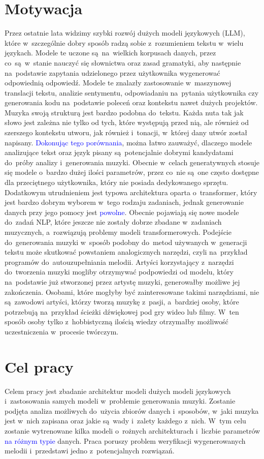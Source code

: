 \documentclass[data-science]{agh-wi} %
\begin{document}
\section{Motywacja}
Przez ostatnie lata widzimy szybki rozwój dużych modeli językowych (LLM), które w~szczególnie dobry sposób radzą sobie z~rozumieniem tekstu w~wielu językach. Modele te uczone są~na~wielkich korpusach danych, przez co~są~w~stanie nauczyć się słownictwa oraz zasad gramatyki, aby następnie na~podstawie zapytania udzielonego przez użytkownika wygenerować odpowiednią odpowiedź. Modele te znalazły zastosowanie w~maszynowej translacji tekstu, analizie sentymentu, odpowiadaniu na~pytania użytkownika czy generowania kodu na~podstawie poleceń oraz kontekstu nawet dużych projektów. Muzyka swoją strukturą jest bardzo podobna do~tekstu. Każda nuta tak jak słowo jest zależna nie tylko od tych, które występują przed nią, ale również od szerszego kontekstu utworu, jak również i~tonacji, w~której dany utwór został napisany. \textcolor{blue}{Dokonując tego porównania}, można łatwo zauważyć, dlaczego modele analizujące tekst oraz język pisany są~potencjalnie dobrymi kandydatami do~próby analizy i~generowania muzyki. Obecnie w~celach generatywnych stosuje się modele o~bardzo dużej ilości parametrów, przez co~nie są~one często dostępne dla przeciętnego użytkownika, który nie posiada dedykowanego sprzętu. Dodatkowym utrudnieniem jest typowa architektura oparta o~transformer, który jest bardzo dobrym wyborem w~tego rodzaju zadaniach, jednak generowanie danych przy jego pomocy jest \textcolor{blue}{powolne}. Obecnie pojawiają się nowe modele do~zadań NLP, które jeszcze nie zostały dobrze zbadane w~zadaniach muzycznych, a~rozwiązują problemy modeli transformerowych. Podejście do~generowania muzyki w~sposób podobny do~metod używanych w~generacji tekstu może skutkować powstaniem analogicznych narzędzi, czyli na~przykład programów do~autouzupełniania  melodii. Artyści korzystający z~narzędzi do~tworzenia muzyki mogliby otrzymywać podpowiedzi od modelu, który na~podstawie już stworzonej przez artystę muzyki, generowałby możliwe jej zakończenia. Osobami, które mogłyby być zainteresowane takimi narzędziami, nie są~zawodowi artyści, którzy tworzą muzykę z~pasji, a~bardziej osoby, które potrzebują na~przykład ścieżki dźwiękowej pod gry wideo lub filmy. W~ten sposób osoby tylko z~hobbistyczną ilością wiedzy otrzymałby możliwość uczestniczenia w~procesie twórczym.
\section{Cel pracy}
Celem pracy jest zbadanie architektur modeli dużych modeli językowych i~zastosowania samych modeli w~problemie generowania muzyki. Zostanie podjęta analiza możliwych do~użycia zbiorów danych i~sposobów, w~jaki muzyka jest w~nich zapisana oraz jakie są~wady i~zalety każdego z~nich. W~tym celu zostanie wytrenowane kilka modeli o~rożnych architekturach i~liczbie parametrów \textcolor{blue}{na różnym typie} danych. Praca poruszy problem weryfikacji wygenerowanych melodii i~przedstawi jedno z~potencjalnych rozwiązań.
\end{document}
